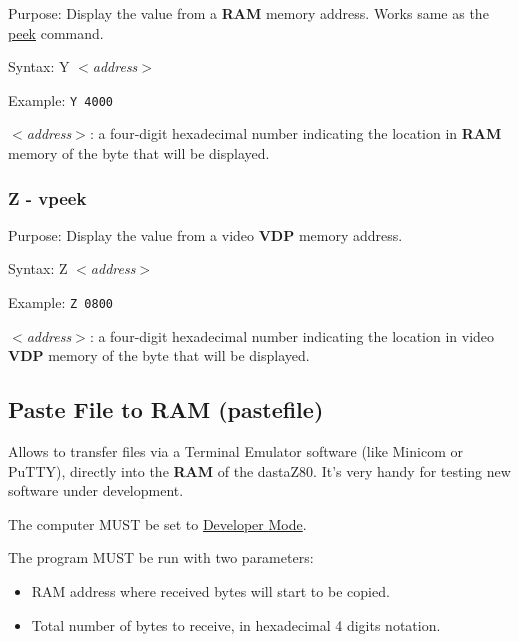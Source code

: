         Purpose: Display the value from a \textbf{RAM} memory address. Works
        same as the \hyperref[cmd:peek]{peek} command.

        Syntax: Y \textit{$<$address$>$}

        Example: \texttt{Y 4000}

        \hspace{1cm}\textit{$<$address$>$}: a four-digit hexadecimal number
        indicating the location in \textbf{RAM} memory of the byte that will be
        displayed.

        \subsubsection{Z - vpeek}

        Purpose: Display the value from a video \textbf{VDP} memory address.

        Syntax: Z \textit{$<$address$>$}

        Example: \texttt{Z 0800}

        \hspace{1cm}\textit{$<$address$>$}: a four-digit hexadecimal number
        indicating the location in video \textbf{VDP} memory of the byte that
        will be displayed.

    \subsection{Paste File to RAM (pastefile)}
    \label{software:pastefile}

    Allows to transfer files via a Terminal Emulator software (like Minicom or
    PuTTY), directly into the \textbf{RAM} of the dastaZ80. It's very handy for
    testing new software under
    development.

    The computer MUST be set to \hyperref[subsec:devmode]{Developer Mode}.

    The program MUST be run with two parameters:

    \begin{itemize}
        \item RAM address where received bytes will start to be copied.
        \item Total number of bytes to receive, in hexadecimal 4 digits notation.
    \end{itemize}

